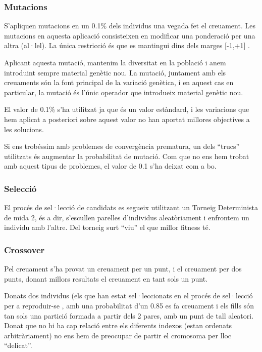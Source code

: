 \subsubsection{Mutacions} %
\label{ssub:Mutacions}

S'apliquen mutacions en un 0.1\% dels individus una vegada fet el creuament.
Les mutacions en aquesta aplicació consisteixen en modificar una ponderació per
una altra (al·lel).  La única restricció és que es mantingui dins dels marges
[-1,+1] .  

Aplicant aquesta mutació, mantenim la diversitat en la població i anem
introduint sempre material genètic nou.  La mutació, juntament amb els
creuaments són la font principal de la variació genètica, i en aquest cas en
particular, la mutació és l'únic operador que introdueix material genètic nou.

El valor de 0.1\% s'ha utilitzat ja que és un valor estàndard, i les variacions
que hem aplicat a posteriori sobre aquest valor no han aportat millores
objectives a les solucions.

Si ens trobéssim amb problemes de convergència prematura, un dels ``trucs''
utilitzats és augmentar la probabilitat de mutació.  Com que no ens hem trobat
amb aquest tipus de problemes, el valor de 0.1 s'ha deixat com a bo.

\subsubsection{Selecció} %
\label{ssub:Seleccio}
El procés de sel·lecció de candidats es segueix utilitzant un Torneig
Determinista de mida 2, és a dir, s'escullen parelles d'individus
aleatòriament i enfrontem un individu amb l'altre. Del torneig surt ``viu'' el
que millor fitness té.

\subsubsection{Crossover} %
\label{ssub:Crossover}

Pel creuament s'ha provat un creuament per un punt, i el creuament per dos
punts, donant millors resultats el creuament en tant sols un punt.  

Donats dos individus (els que han estat sel·leccionats en el procés de
sel·lecció per a reproduir-se , amb una probabilitat d'un 0.85 es fa creuament i
els fills són tan sols una partició formada a partir dels 2 pares, amb un punt
de tall aleatori.  Donat que no hi ha cap relació entre els diferents indexos
(estan ordenats arbitràriament) no ens hem de preocupar de partir el cromosoma
per lloc ``delicat''. 


